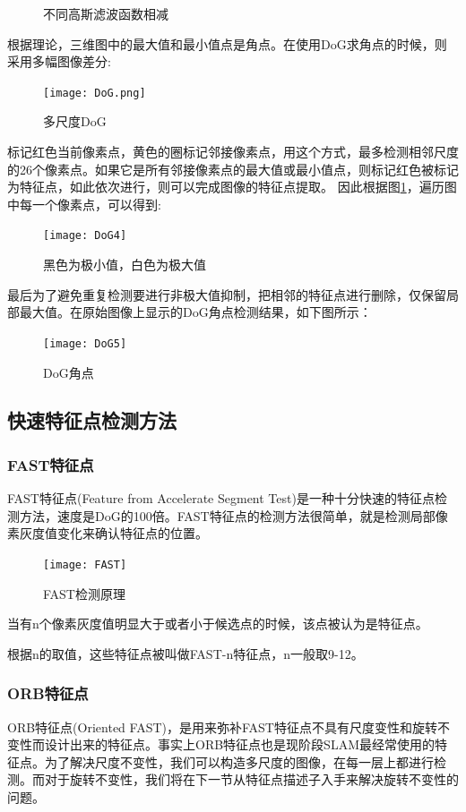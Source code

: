 \begin{figure}[H]
\begin{subfigure}[ht]{0.3\textwidth}
	\end{subfigure}
	\caption{不同高斯滤波函数相减}\label{differentsigma}
\end{figure}
根据理论，三维图中的最大值和最小值点是角点。在使用DoG求角点的时候，则采用多幅图像差分:\par
\begin{figure}[H]
	\centering
	\texttt{[image: DoG.png]}
	\caption{多尺度DoG}
\end{figure}\par
标记红色当前像素点，黄色的圈标记邻接像素点，用这个方式，最多检测相邻尺度的26个像素点。如果它是所有邻接像素点的最大值或最小值点，则标记红色被标记为特征点，如此依次进行，则可以完成图像的特征点提取。
因此根据图\ref{differentsigma}，遍历图中每一个像素点，可以得到:
\begin{figure}[H]
	\centering
	\texttt{[image: DoG4]}
	\caption{黑色为极小值，白色为极大值}
\end{figure}\par
最后为了避免重复检测要进行非极大值抑制，把相邻的特征点进行删除，仅保留局部最大值。在原始图像上显示的DoG角点检测结果，如下图所示：
\begin{figure}
	\centering
	\texttt{[image: DoG5]}
	\caption{DoG角点}
\end{figure}
\subsection{快速特征点检测方法}
\subsubsection{FAST特征点}
FAST特征点(Feature from Accelerate Segment Test)\cite{rosten2005fusing}是一种十分快速的特征点检测方法，速度是DoG的100倍。FAST特征点的检测方法很简单，就是检测局部像素灰度值变化来确认特征点的位置。\par
\begin{figure}[H]
	\centering
	\texttt{[image: FAST]}
	\caption{FAST检测原理}
\end{figure}
当有n个像素灰度值明显大于或者小于候选点的时候，该点被认为是特征点。\par
根据n的取值，这些特征点被叫做FAST-n特征点，n一般取9-12。
\subsubsection{ORB特征点}
ORB特征点(Oriented FAST)，是用来弥补FAST特征点不具有尺度变性和旋转不变性而设计出来的特征点。事实上ORB特征点也是现阶段SLAM最经常使用的特征点。为了解决尺度不变性，我们可以构造多尺度的图像，在每一层上都进行检测。而对于旋转不变性，我们将在下一节从特征点描述子入手来解决旋转不变性的问题。
